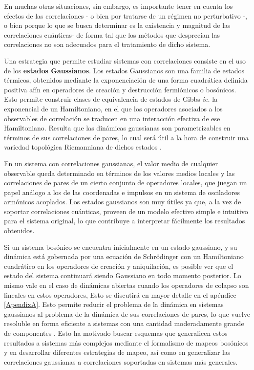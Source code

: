 \documentclass{report} %
\newcommand{\ie}{\textit{ie. }}
\numberwithin{equation}{section}
\begin{document}
En muchas otras situaciones, sin embargo, es importante tener en cuenta los efectos de las correlaciones - o bien por tratarse de un régimen no perturbativo -, o bien porque lo que se busca determinar es la existencia y magnitud de las correlaciones cuánticas- de forma tal que los métodos que desprecian las correlaciones no son adecuados para el tratamiento de dicho sistema. 

Una estrategia que permite estudiar sistemas con correlaciones consiste en el uso de los \textbf{estados Gaussianos}. Los estados Gaussianos son una familia de estados térmicos, obtenidos mediante la exponenciación de una forma cuadrática definida positiva afín en operadores de creación y destrucción fermiónicos o bosónicos. Esto permite construir clases de equivalencia de estados de Gibbs \cite{PATHRIA2011115} \ie la exponencial de un Hamiltoniano, en el que los operadores asociados a los observables de correlación se traducen en una interacción efectiva de ese Hamiltoniano. Resulta que las dinámicas gaussianas son parametrizables en términos de sus correlaciones de pares, lo cual será útil a la hora de construir una variedad topológica Riemanniana de dichos estados \cite{NakaharaM}.

En un sistema con correlaciones gaussianas, el valor medio de cualquier observable queda determinado en términos de los valores medios locales y las correlaciones de pares de un cierto conjunto de operadores locales, que juegan un papel análogo a los de las coordenadas e impulsos en un sistema de osciladores armónicos acoplados. Los estados gaussianos son muy útiles ya que, a la vez de soportar correlaciones cuánticas,  proveen de un modelo efectivo simple e intuitivo para el sistema original, lo que contribuye a interpretar fácilmente los resultados obtenidos.

Si un sistema bosónico se encuentra inicialmente en un estado gaussiano, y su dinámica está gobernada por una ecuación de Schr\"odinger con un Hamiltoniano cuadrático en los operadores de creación y aniquilación, es posible ver que el estado del sistema continuará siendo Gaussiano en todo momento posterior. Lo mismo vale en el caso de dinámicas abiertas cuando los operadores de colapso son lineales en estos operadores, Esto se discutirá en mayor detalle en el apéndice \ref{ApendixA}. Esto permite reducir el problema de la dinámica en sistemas gaussianos al problema de la dinámica de sus correlaciones de pares, lo que vuelve resoluble en forma eficiente a sistemas con una cantidad moderadamente grande de componentes \cite{Feynman1963,Illuminati2018}. Esto ha motivado buscar esquemas que generalicen estos resultados a sistemas más complejos mediante el formalismo de mapeos bosónicos y en desarrollar diferentes estrategias de mapeo, así como en generalizar las correlaciones gaussianas a correlaciones soportadas en sistemas más generales.
\end{document}
